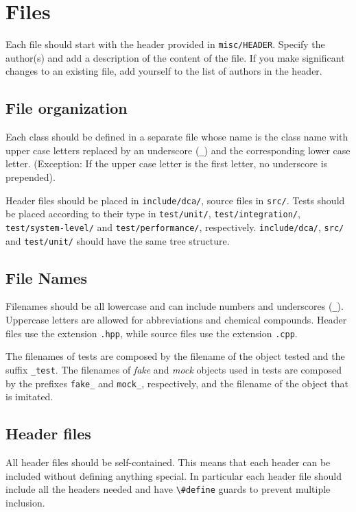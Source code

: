 \documentclass[a4paper]{article}
\newcommand{\inlinecode}[1]{\lstinline|#1|}
\begin{document}
\tableofcontents

\section{Files}
Each file should start with the header provided in \inlinecode{misc/HEADER}.
Specify the author(s) and add a description of the content of the file.
If you make significant changes to an existing file, add yourself to the list of authors in the header.

\subsection{File organization}
Each class should be defined in a separate file whose name is the class name with upper case letters replaced by an underscore (\inlinecode{_}) and the corresponding lower case letter.
(Exception: If the upper case letter is the first letter, no underscore is prepended).

Header files should be placed in \verb|include/dca/|, source files in \verb|src/|.
Tests should be placed according to their type in \verb|test/unit/|, \verb|test/integration/|, \verb|test/system-level/| and \verb|test/performance/|, respectively.
\verb|include/dca/|, \verb|src/| and \verb|test/unit/| should have the same tree structure.

\subsection{File Names}
Filenames should be all lowercase and can include numbers and underscores (\inlinecode{_}).
Uppercase letters are allowed for abbreviations and chemical compounds.
Header files use the extension \verb|.hpp|, while source files use the extension \verb|.cpp|.

The filenames of tests are composed by the filename of the object tested and the suffix \inlinecode{_test}.
The filenames of \emph{fake} and \emph{mock} objects used in tests are composed by the prefixes \inlinecode{fake_} and \inlinecode{mock_}, respectively, and the filename of the object that is imitated.

\subsection{Header files}
All header files should be self-contained.
This means that each header can be included without defining anything special.
In particular each header file should include all the headers needed and have \inlinecode{\#define} guards to prevent multiple inclusion.
\end{document}
